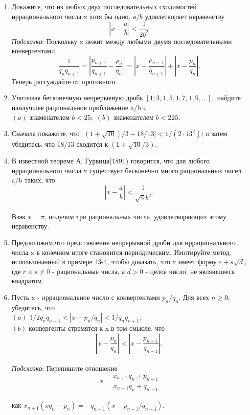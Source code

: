 \documentclass[11pt]{article}
\begin{document}
\begin{enumerate}
\item Докажите, что из любых двух последовательных сходимостей иррационального числа x хотя бы одно, $a/b$ удовлетворяет неравенству $$|x-\frac{a}{b}|<\frac{1}{2b^{2}}$$ \textit{Подсказка}: Поскольку x лежит между любыми двумя последовательными конвергентами, $$\frac{1}{q_{n}q_{n+1}}=|\frac{p_{n+1}}{q_{n+1}}-\frac{p_{n}}{q_{n}}|=|x-\frac{p_{n+1}}{q_{n+1}}|+|x-\frac{p_{n}}{q_{n}}|.$$ Теперь рассуждайте от противного.

\item Учитывая бесконечную непрерывную дробь $[1;3,1,5,1,7,1,9,...],$ найдите наилучшее рациональное приближение a/b с \\ $(a)$ знаменателем $b<25;$ $(b)$ знаменателем $b<225.$
	
\item Сначала покажите, что $|(1+\sqrt{10})/3-18/13|<1/(2\cdot13^{2})$; и затем убедитесь, что 18/13 сходится к $(1+\sqrt{10}/3)$.

\item В известной теореме А. Гурвица(1891) говорится, что для любого иррационального числа x существует бесконечно много рациональных чисел a/b таких, что $$|x-\frac{a}{b}|<\frac{1}{\sqrt{5}b^{2}}.$$ \\ Взяв $x=\pi$, получим три рациональных числа, удовлетворяющих этому неравенству.

\item Предположим,что представление непрерывной дроби для иррационального числа x в конечном итоге становится периодическим. Имитируйте метод, использованный в примере 13-4,  чтобы доказать, что x имеет форму $r+s\sqrt{d}$, где $r$ и $s\neq0$ - рациональные числа, а $d>0$ - целое число, не являющееся квадратом.

\item Пусть x - иррациональное число с конвергентами $p_{n}/q_{n}$. Для всех $n\geq0$, убедитесь, что \\ $ (a)$ $ 1/2q_{n}q_{n+1}<|x-p_{n}/q_{n}|<1/q_{n}q_{n+1}$; \\ $(b)$ конвергенты стремятся к x в том смысле, что $$|x-\frac{p_{n}}{q_{n}}|<|x-\frac{p_{n-1}}{q_{n-1}}|.$$ \\ \textit{Подсказка}: Перепишите отношение $$x=\frac{x_{n+1}q_{n}+p_{n-1}}{x_{n+1}q_{n}+q_{n-1}}$$ \\ как $x_{n+1}(xq_{n}-p_{n})=-q_{n-1}(x-p_{n-1}/q_{n-1}).$

 
\end{enumerate}

\newpage
		
\end{document}
